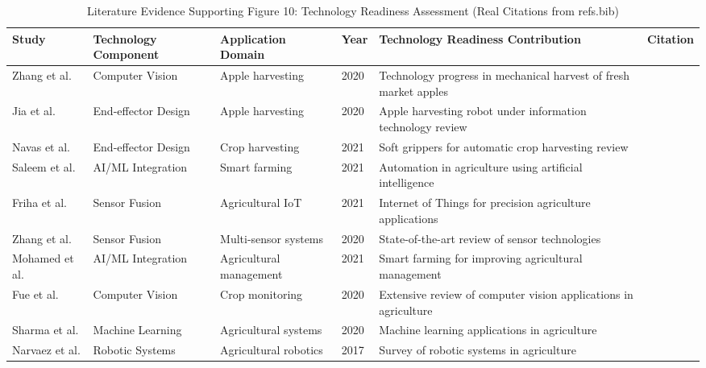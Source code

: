 \begin{table*}[htbp]
\centering
\small
\caption{Literature Evidence Supporting Figure 10: Technology Readiness Assessment (Real Citations from refs.bib)}
\label{tab:figure10_real_support}
\begin{tabular}{p{}p{}p{}p{}p{}p{}}
\toprule
\textbf{Study} & \textbf{Technology Component} & \textbf{Application Domain} & \textbf{Year} & \textbf{Technology Readiness Contribution} & \textbf{Citation} \\ \midrule

Zhang et al. & Computer Vision & Apple harvesting & 2020 & Technology progress in mechanical harvest of fresh market apples & \cite{zhang2020technology} \\

Jia et al. & End-effector Design & Apple harvesting & 2020 & Apple harvesting robot under information technology review & \cite{jia2020apple} \\

Navas et al. & End-effector Design & Crop harvesting & 2021 & Soft grippers for automatic crop harvesting review & \cite{navas2021soft} \\

Saleem et al. & AI/ML Integration & Smart farming & 2021 & Automation in agriculture using artificial intelligence & \cite{saleem2021automation} \\

Friha et al. & Sensor Fusion & Agricultural IoT & 2021 & Internet of Things for precision agriculture applications & \cite{friha2021internet} \\

Zhang et al. & Sensor Fusion & Multi-sensor systems & 2020 & State-of-the-art review of sensor technologies & \cite{zhang2020state} \\

Mohamed et al. & AI/ML Integration & Agricultural management & 2021 & Smart farming for improving agricultural management & \cite{mohamed2021smart} \\

Fue et al. & Computer Vision & Crop monitoring & 2020 & Extensive review of computer vision applications in agriculture & \cite{fue2020extensive} \\

Sharma et al. & Machine Learning & Agricultural systems & 2020 & Machine learning applications in agriculture & \cite{sharma2020machine} \\

Narvaez et al. & Robotic Systems & Agricultural robotics & 2017 & Survey of robotic systems in agriculture & \cite{narvaez2017survey} \\

\bottomrule
\end{tabular}
\end{table*}

